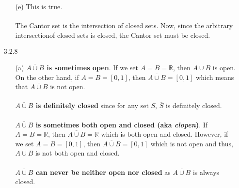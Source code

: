 \documentclass[11pt]{article}
\newcommand{\reals}{\mathbb{R}}
\begin{document}
\begin{itemize}
\begin{itemize}
            \item[(e)]
                This is true.
                \\
                \\
                The Cantor set is the intersection of closed sets. Now, since
                the arbitrary intersectionof closed sets is closed, the Cantor
                set must be closed.
        \end{itemize}

    \newpage

    \item[3.2.8]
        \begin{itemize}
            \item[(a)]
                \textbf{$\overline{A \cup B}$ is sometimes open}. If we set $A
                = B = \reals$, then $A \cup B$ is open. On the other hand, if
                $A = B = [0, 1]$, then $\overline{A \cup B} = [0, 1]$ which
                means that $\overline{A \cup B}$ is not open.
                \\
                \\
                \textbf{$\overline{A \cup B}$ is definitely closed} since for
                any set $S$, $\overline{S}$ is definitely closed.
                \\
                \\
                \textbf{$\overline{A \cup B}$ is sometimes both open and closed
                (aka \textit{clopen})}. If $A = B = \reals$, then $\overline{A
                \cup B} = \reals$ which is both open and closed. However, if we
                set $A = B = [0, 1]$, then $\overline{A \cup B} = [0, 1]$ which
                is not open and thus, $\overline{A \cup B}$ is not both open
                and closed.
                \\
                \\
                \textbf{$\overline{A \cup B}$ can never be neither open nor
                closed} as $\overline{A \cup B}$ is always closed.


\end{itemize}
\end{itemize}
\end{document}
